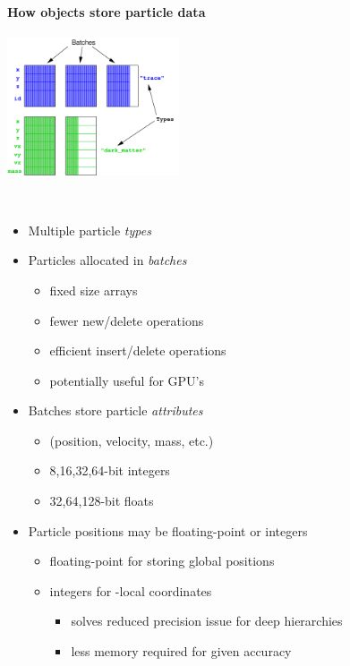 \begin{frame}[fragile] 
  \secframetitle{\ssRecentParticles}
\framesubtitle{How  objects store particle data}
\begin{minipage}{1.8in}
\includegraphics[width=2.0in]{particles-design.pdf} \ \\
\end{minipage} \ 
\begin{minipage}{2.5in}
\begin{itemize}
\item Multiple particle \textit{types}
\item Particles allocated in \textit{batches}
\begin{itemize}
\item fixed size arrays
\item fewer new/delete operations
\item efficient insert/delete operations
\item potentially useful for GPU's
\end{itemize}
\item Batches store particle \textit{attributes}
\begin{itemize}
\item (position, velocity, mass, etc.)
\item 8,16,32,64-bit integers
\item 32,64,128-bit floats
\end{itemize}
\end{itemize}
\end{minipage}
\begin{itemize}
\item Particle positions may be floating-point or integers
\begin{itemize}
\item floating-point for storing global positions
\item integers for -local coordinates
\begin{itemize}
\item solves reduced precision issue for deep hierarchies
\item less memory required for given accuracy
\end{itemize}
\end{itemize}
\end{itemize}
\end{frame}

